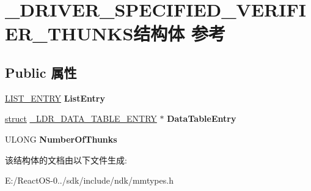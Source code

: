 \hypertarget{struct___d_r_i_v_e_r___s_p_e_c_i_f_i_e_d___v_e_r_i_f_i_e_r___t_h_u_n_k_s}{}\section{\+\_\+\+D\+R\+I\+V\+E\+R\+\_\+\+S\+P\+E\+C\+I\+F\+I\+E\+D\+\_\+\+V\+E\+R\+I\+F\+I\+E\+R\+\_\+\+T\+H\+U\+N\+K\+S结构体 参考}
\label{struct___d_r_i_v_e_r___s_p_e_c_i_f_i_e_d___v_e_r_i_f_i_e_r___t_h_u_n_k_s}
\subsection*{Public 属性}
\begin{DoxyCompactItemize}
\item 
\mbox{\label{struct___d_r_i_v_e_r___s_p_e_c_i_f_i_e_d___v_e_r_i_f_i_e_r___t_h_u_n_k_s_aae813de3e75f2e25ed28dffbff36d717}} 
\hyperlink{struct___l_i_s_t___e_n_t_r_y}{L\+I\+S\+T\+\_\+\+E\+N\+T\+RY} {\bfseries List\+Entry}
\item 
\mbox{\label{struct___d_r_i_v_e_r___s_p_e_c_i_f_i_e_d___v_e_r_i_f_i_e_r___t_h_u_n_k_s_aed31b13a351c72f931ef9f336afc01cc}} 
\hyperlink{interfacestruct}{struct} \hyperlink{struct___l_d_r___d_a_t_a___t_a_b_l_e___e_n_t_r_y}{\+\_\+\+L\+D\+R\+\_\+\+D\+A\+T\+A\+\_\+\+T\+A\+B\+L\+E\+\_\+\+E\+N\+T\+RY} $\ast$ {\bfseries Data\+Table\+Entry}
\item 
\mbox{\label{struct___d_r_i_v_e_r___s_p_e_c_i_f_i_e_d___v_e_r_i_f_i_e_r___t_h_u_n_k_s_a06e68b45d2ee0f487adc19f5b3574526}} 
U\+L\+O\+NG {\bfseries Number\+Of\+Thunks}
\end{DoxyCompactItemize}


该结构体的文档由以下文件生成\+:\begin{DoxyCompactItemize}
\item 
E\+:/\+React\+O\+S-\/0../sdk/include/ndk/mmtypes.\+h\end{DoxyCompactItemize}
